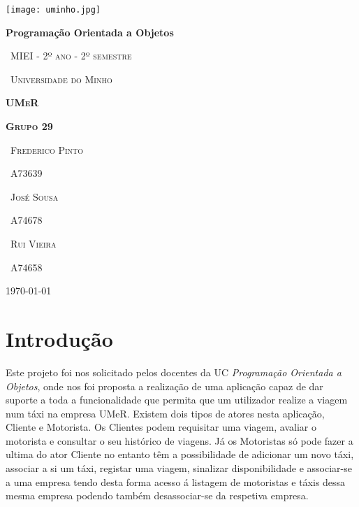 \documentclass[12pt,a4paper]{report}
\begin{document}
\begin{titlepage}
	\centering
	\texttt{[image: uminho.jpg]}\par\vspace{1cm}
	{\huge\bfseries Programação Orientada a Objetos \par}
	\vspace{0.5cm}
	{\scshape\ MIEI - 2º ano - 2º semestre\par}
	\vspace{0.1cm}
	{\scshape\ Universidade do Minho\par}
	\vspace{1.5cm}
    {\scshape\Huge\bfseries UMeR \par}
	\vspace{3cm}
	{\scshape\Huge\bfseries Grupo 29 \par}
    \vspace{1cm}
	{\scshape\ Frederico Pinto \par} 	\vspace{0.1cm}
	{\scshape\ A73639 \par}  \vspace{0.3cm}
	{\scshape\ José Sousa \par} \vspace{0.1cm}
	{\scshape\ A74678 \par}  \vspace{0.3cm}
	{\scshape\ Rui Vieira \par} \vspace{0.1cm}
	{\scshape\ A74658 \par}  \vspace{0.3cm}

	\vfill
	{\large \today\par}
\end{titlepage}

\tableofcontents

\chapter{Introdução}

Este projeto foi nos solicitado pelos docentes da UC \emph{Programação Orientada a Objetos}, onde nos foi proposta a realização de uma aplicação capaz de dar suporte a toda a funcionalidade que permita que um utilizador realize a viagem num táxi na empresa UMeR. Existem dois tipos de atores nesta aplicação, Cliente e Motorista. Os Clientes podem requisitar uma viagem, avaliar o motorista e consultar o seu histórico de viagens. Já os Motoristas só pode fazer a ultima do ator Cliente no entanto têm a possibilidade de adicionar um novo táxi, associar a si um táxi, registar uma viagem, sinalizar disponibilidade e associar-se a uma empresa tendo desta forma acesso á listagem de motoristas e táxis dessa mesma empresa podendo também desassociar-se da respetiva empresa.  
\end{document}
